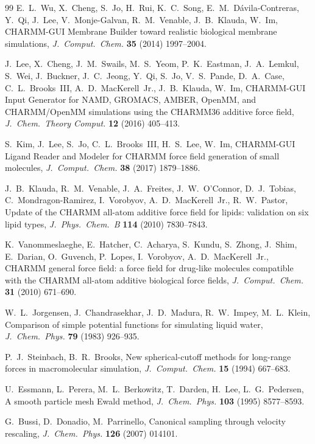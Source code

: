 \documentclass[11pt,a4paper]{article}
\begin{document}
\begin{thebibliography}{99}
E.~L.~Wu, X.~Cheng, S.~Jo, H.~Rui, K.~C.~Song, E.~M.~D\'{a}vila-Contreras, Y.~Qi, J.~Lee,
V.~Monje-Galvan, R.~M.~Venable, J.~B.~Klauda, W.~Im,
CHARMM-GUI Membrane Builder toward realistic biological membrane simulations,
\emph{J.\ Comput.\ Chem.} \textbf{35} (2014) 1997--2004.

J.~Lee, X.~Cheng, J.~M.~Swails, M.~S.~Yeom, P.~K.~Eastman, J.~A.~Lemkul, S.~Wei, J.~Buckner,
J.~C.~Jeong, Y.~Qi, S.~Jo, V.~S.~Pande, D.~A.~Case, C.~L.~Brooks~III, A.~D.~MacKerell~Jr.,
J.~B.~Klauda, W.~Im,
CHARMM-GUI Input Generator for NAMD, GROMACS, AMBER, OpenMM, and CHARMM/OpenMM simulations using the
CHARMM36 additive force field, \emph{J.\ Chem.\ Theory Comput.} \textbf{12} (2016) 405--413.

S.~Kim, J.~Lee, S.~Jo, C.~L.~Brooks~III, H.~S.~Lee, W.~Im,
CHARMM-GUI Ligand Reader and Modeler for CHARMM force field generation of small molecules,
\emph{J.\ Comput.\ Chem.} \textbf{38} (2017) 1879--1886.

J.~B.~Klauda, R.~M.~Venable, J.~A.~Freites, J.~W.~O'Connor, D.~J.~Tobias, C.~Mondragon-Ramirez,
I.~Vorobyov, A.~D.~MacKerell~Jr., R.~W.~Pastor,
Update of the CHARMM all-atom additive force field for lipids: validation on six lipid types,
\emph{J.\ Phys.\ Chem.\ B} \textbf{114} (2010) 7830--7843.

K.~Vanommeslaeghe, E.~Hatcher, C.~Acharya, S.~Kundu, S.~Zhong, J.~Shim, E.~Darian, O.~Guvench,
P.~Lopes, I.~Vorobyov, A.~D.~MacKerell~Jr.,
CHARMM general force field: a force field for drug-like molecules compatible with the CHARMM all-atom
additive biological force fields, \emph{J.\ Comput.\ Chem.} \textbf{31} (2010) 671--690.

W.~L.~Jorgensen, J.~Chandrasekhar, J.~D.~Madura, R.~W.~Impey, M.~L.~Klein,
Comparison of simple potential functions for simulating liquid water,
\emph{J.\ Chem.\ Phys.} \textbf{79} (1983) 926--935.

P.~J.~Steinbach, B.~R.~Brooks,
New spherical-cutoff methods for long-range forces in macromolecular simulation,
\emph{J.\ Comput.\ Chem.} \textbf{15} (1994) 667--683.

U.~Essmann, L.~Perera, M.~L.~Berkowitz, T.~Darden, H.~Lee, L.~G.~Pedersen,
A smooth particle mesh Ewald method, \emph{J.\ Chem.\ Phys.} \textbf{103} (1995) 8577--8593.

G.~Bussi, D.~Donadio, M.~Parrinello,
Canonical sampling through velocity rescaling, \emph{J.\ Chem.\ Phys.} \textbf{126} (2007) 014101.


\end{thebibliography}
\end{document}
